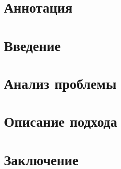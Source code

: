 \documentclass[oneside, final, 12pt]{article}
\theoremstyle{plain}
\theoremstyle{plain} %
\begin{document}
\setcounter{page}{2}
\section*{Аннотация} 

\pagebreak

\tableofcontents


\pagebreak 

\section{Введение} 

\pagebreak
\section{Анализ проблемы}

\pagebreak
\section{Описание подхода}


\pagebreak
\section{Заключение}


\pagebreak
\end{document}
